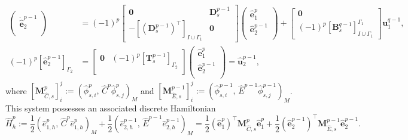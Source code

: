 \documentclass{elsarticle}
\newcommand*{\dual}[1]{\ensuremath{\widehat{#1}}}
\newcommand{\inpr}[3][]{\ensuremath{( #2, \, #3 )_{#1}}}
\begin{document}
{\begin{equation}
\begin{aligned}
\begin{pmatrix}
    \dot{\dual{\mathbf{e}}}^{p-1}_2 \\
    \end{pmatrix} &=  (-1)^p
    \begin{bmatrix}
        \mathbf{0} & \mathbf{D}^{p-1}_s \\
        -[(\mathbf{D}_{s}^{p-1})^\top]_{I \cup \Gamma_1} & \mathbf{0}
    \end{bmatrix}
    \begin{pmatrix}
    {\dual{\mathbf{e}}}^p_1 \\
    {\dual{\mathbf{e}}}^{p-1}_2 \\
    \end{pmatrix} +
    \begin{bmatrix}
        \mathbf{0}\\
        (-1)^{p}[\mathbf{B}^{q-1}_{s}]_{I \cup \Gamma_1}^{\Gamma_1}
    \end{bmatrix}
    \mathbf{u}^{q-1}_1, \\
    (-1)^p[{\dual{\mathbf{e}}}^{p-1}_2]_{\Gamma_2} &= 
    \begin{bmatrix}
    \mathbf{0} & (-1)^p[\mathbf{T}^{p-1}_{s}]_{\Gamma_2} \\
    \end{bmatrix}
    \begin{pmatrix}
    {\dual{\mathbf{e}}}^p_1 \\
    {\dual{\mathbf{e}}}^{p-1}_2 \\
    \end{pmatrix} = \dual{\mathbf{u}}^{p-1}_2,
\end{aligned}
\end{equation}
where $[\mathbf{M}_{\dual{C}, s}^p]_{i}^j := \inpr[M]{\dual{\phi}^p_{s, i}}{\dual{C}^p \dual{\phi}^p_{s, j}}$ and $[\mathbf{M}_{\dual{E}, s}^{p-1}]_{i}^j := \inpr[M]{\dual{\phi}^{p-1}_{s, i}}{\dual{E}^{p-1}\dual{\phi}^{p-1}_{s, j}}$.
This system possesses an associated discrete Hamiltonian
\begin{equation}\label{eq:discr_H_primal}
\dual{H}_h^{p} := \frac{1}{2}\inpr[M]{\dual{e}_{1, h}^p}{\dual{C}^p \dual{e}_{1, h}^p} + \frac{1}{2}\inpr[M]{\dual{e}_{2, h}^{p-1}}{\dual{E}^{p-1} \dual{e}_{2, h}^{p-1}} = \frac{1}{2} (\dual{\mathbf{e}}^p_1)^\top \mathbf{M}^p_{\dual{C}, s} \dual{\mathbf{e}}^p_1 + \frac{1}{2} (\dual{\mathbf{e}}^{p-1}_2)^\top \mathbf{M}^{p-1}_{\dual{E}, s} \dual{\mathbf{e}}^{p-1}_2.
\end{equation}


}
\end{document}
